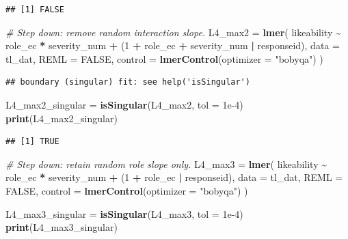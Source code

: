 \documentclass[
]{article}
\newenvironment{Shaded}{\begin{snugshade}}{\end{snugshade}}
\newcommand{\AttributeTok}[1]{\textcolor[rgb]{0.13,0.29,0.53}{#1}}
\newcommand{\CommentTok}[1]{\textcolor[rgb]{0.56,0.35,0.01}{\textit{#1}}}
\newcommand{\ConstantTok}[1]{\textcolor[rgb]{0.56,0.35,0.01}{#1}}
\newcommand{\DecValTok}[1]{\textcolor[rgb]{0.00,0.00,0.81}{#1}}
\newcommand{\FloatTok}[1]{\textcolor[rgb]{0.00,0.00,0.81}{#1}}
\newcommand{\FunctionTok}[1]{\textcolor[rgb]{0.13,0.29,0.53}{\textbf{#1}}}
\newcommand{\NormalTok}[1]{#1}
\newcommand{\OtherTok}[1]{\textcolor[rgb]{0.56,0.35,0.01}{#1}}
\newcommand{\SpecialCharTok}[1]{\textcolor[rgb]{0.81,0.36,0.00}{\textbf{#1}}}
\newcommand{\StringTok}[1]{\textcolor[rgb]{0.31,0.60,0.02}{#1}}
\begin{document}
\begin{verbatim}
## [1] FALSE
\end{verbatim}

\begin{Shaded}
\begin{Highlighting}[]
\CommentTok{\# Step down: remove random interaction slope.}
\NormalTok{L4\_max2 }\OtherTok{=} \FunctionTok{lmer}\NormalTok{(}
\NormalTok{  likeability }\SpecialCharTok{\textasciitilde{}}\NormalTok{ role\_ec }\SpecialCharTok{*}\NormalTok{ severity\_num }\SpecialCharTok{+}
\NormalTok{    (}\DecValTok{1} \SpecialCharTok{+}\NormalTok{ role\_ec }\SpecialCharTok{+}\NormalTok{ severity\_num }\SpecialCharTok{|}\NormalTok{ responseid),}
  \AttributeTok{data =}\NormalTok{ tl\_dat,}
  \AttributeTok{REML =} \ConstantTok{FALSE}\NormalTok{,}
  \AttributeTok{control =} \FunctionTok{lmerControl}\NormalTok{(}\AttributeTok{optimizer =} \StringTok{"bobyqa"}\NormalTok{)}
\NormalTok{)}
\end{Highlighting}
\end{Shaded}

\begin{verbatim}
## boundary (singular) fit: see help('isSingular')
\end{verbatim}

\begin{Shaded}
\begin{Highlighting}[]
\NormalTok{L4\_max2\_singular }\OtherTok{=} \FunctionTok{isSingular}\NormalTok{(L4\_max2, }\AttributeTok{tol =} \FloatTok{1e{-}4}\NormalTok{)}
\FunctionTok{print}\NormalTok{(L4\_max2\_singular)}
\end{Highlighting}
\end{Shaded}

\begin{verbatim}
## [1] TRUE
\end{verbatim}

\begin{Shaded}
\begin{Highlighting}[]
\CommentTok{\# Step down: retain random role slope only.}
\NormalTok{L4\_max3 }\OtherTok{=} \FunctionTok{lmer}\NormalTok{(}
\NormalTok{  likeability }\SpecialCharTok{\textasciitilde{}}\NormalTok{ role\_ec }\SpecialCharTok{*}\NormalTok{ severity\_num }\SpecialCharTok{+}
\NormalTok{    (}\DecValTok{1} \SpecialCharTok{+}\NormalTok{ role\_ec }\SpecialCharTok{|}\NormalTok{ responseid),}
  \AttributeTok{data =}\NormalTok{ tl\_dat,}
  \AttributeTok{REML =} \ConstantTok{FALSE}\NormalTok{,}
  \AttributeTok{control =} \FunctionTok{lmerControl}\NormalTok{(}\AttributeTok{optimizer =} \StringTok{"bobyqa"}\NormalTok{)}
\NormalTok{)}

\NormalTok{L4\_max3\_singular }\OtherTok{=} \FunctionTok{isSingular}\NormalTok{(L4\_max3, }\AttributeTok{tol =} \FloatTok{1e{-}4}\NormalTok{)}
\FunctionTok{print}\NormalTok{(L4\_max3\_singular)}
\end{Highlighting}
\end{Shaded}
\end{document}
